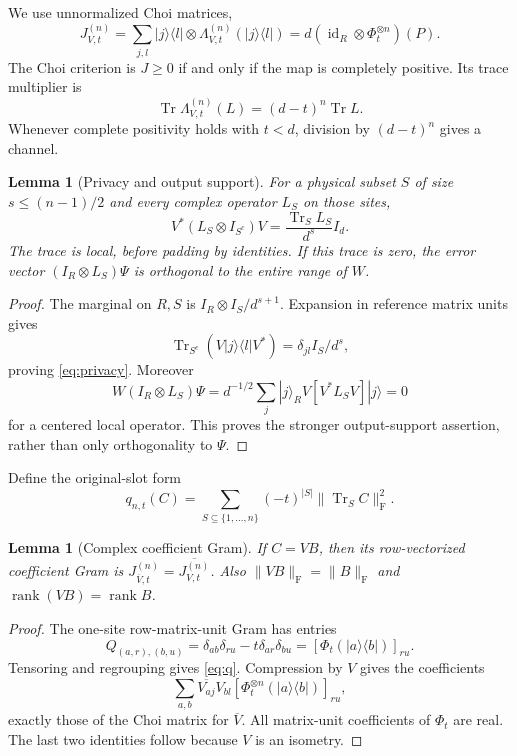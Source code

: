 \documentclass[11pt,a4paper]{article}
\newtheorem{lemma}[theorem]{Lemma}
\newcommand{\Tr}{\operatorname{Tr}}
\newcommand{\id}{\operatorname{id}}
\newcommand{\F}{\mathrm F}
\DeclareMathOperator{\rank}{rank}
\begin{document}
We use unnormalized Choi matrices,
\[
 J^{(n)}_{V,t}=\sum_{j,l}|j\rangle\langle l|\otimes
             \Lambda^{(n)}_{V,t}(|j\rangle\langle l|)
       =d(\id_R\otimes\Phi_t^{\otimes n})(P).
\]
The Choi criterion is \(J\ge0\) if and only if the map is completely positive. Its trace multiplier is
\begin{equation}\label{eq:trace-general}
 \Tr\Lambda^{(n)}_{V,t}(L)=(d-t)^n\Tr L.
\end{equation}
Whenever complete positivity holds with \(t<d\), division by \((d-t)^n\) gives a channel.

\begin{lemma}[Privacy and output support]\label{lem:privacy}
For a physical subset \(S\) of size \(s\le(n-1)/2\) and every complex operator \(L_S\) on those sites,
\begin{equation}\label{eq:privacy}
 V^*(L_S\otimes I_{S^c})V=\frac{\Tr_S L_S}{d^s}I_d.
\end{equation}
The trace is local, before padding by identities. If this trace is zero, the error vector \((I_R\otimes L_S)\Psi\) is orthogonal to the entire range of \(W\).
\end{lemma}
\begin{proof}
The marginal on \(R,S\) is \(I_R\otimes I_S/d^{s+1}\). Expansion in reference matrix units gives
\[
\Tr_{S^c}(V|j\rangle\langle l|V^*)=\delta_{jl}I_S/d^s,
\]
proving \eqref{eq:privacy}. Moreover
\[
 W(I_R\otimes L_S)\Psi
 =d^{-1/2}\sum_j|j\rangle_R V[V^*L_SV]|j\rangle=0
\]
for a centered local operator. This proves the stronger output-support assertion, rather than only orthogonality to \(\Psi\).
\end{proof}

Define the original-slot form
\begin{equation}\label{eq:q}
 q_{n,t}(C)=\sum_{S\subseteq\{1,\ldots,n\}}(-t)^{|S|}
                       \|\Tr_S C\|_{\F}^{2}.
\end{equation}
\begin{lemma}[Complex coefficient Gram]\label{lem:gram}
If \(C=VB\), then its row-vectorized coefficient Gram is
\(J^{(n)}_{\overline V,t}=\overline{J^{(n)}_{V,t}}\).
Also \(\|VB\|_{\F}=\|B\|_{\F}\) and \(\rank(VB)=\rank B\).
\end{lemma}
\begin{proof}
The one-site row-matrix-unit Gram has entries
\[
 Q_{(a,r),(b,u)}=\delta_{ab}\delta_{ru}-t\delta_{ar}\delta_{bu}
                   =[\Phi_t(|a\rangle\langle b|)]_{ru}.
\]
Tensoring and regrouping gives \eqref{eq:q}. Compression by \(V\) gives the coefficients
\[
\sum_{a,b}\overline{V_{aj}}V_{bl}[\Phi_t^{\otimes n}(|a\rangle\langle b|)]_{ru},
\]
exactly those of the Choi matrix for \(\overline V\). All matrix-unit coefficients of \(\Phi_t\) are real. The last two identities follow because \(V\) is an isometry.
\end{proof}
\end{document}
